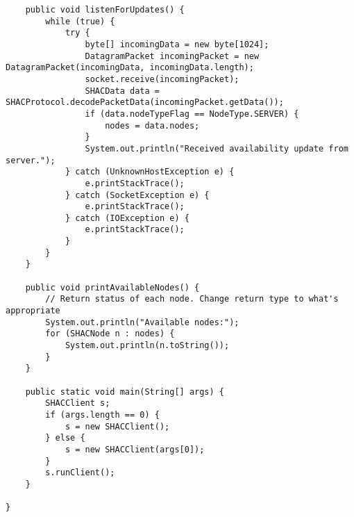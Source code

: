 \documentclass[11pt]{article}
\begin{document}
\begin{doublespace}
\begin{lstlisting}
    public void listenForUpdates() {
        while (true) {
            try {
                byte[] incomingData = new byte[1024];
                DatagramPacket incomingPacket = new DatagramPacket(incomingData, incomingData.length);
                socket.receive(incomingPacket);
                SHACData data = SHACProtocol.decodePacketData(incomingPacket.getData());
                if (data.nodeTypeFlag == NodeType.SERVER) {
                    nodes = data.nodes;
                }
                System.out.println("Received availability update from server.");
            } catch (UnknownHostException e) {
                e.printStackTrace();
            } catch (SocketException e) {
                e.printStackTrace();
            } catch (IOException e) {
                e.printStackTrace();
            }
        }
    }

    public void printAvailableNodes() {
        // Return status of each node. Change return type to what's appropriate
        System.out.println("Available nodes:");
        for (SHACNode n : nodes) {
            System.out.println(n.toString());
        }
    }

    public static void main(String[] args) {
        SHACClient s;
        if (args.length == 0) {
            s = new SHACClient();
        } else {
            s = new SHACClient(args[0]);
        }
        s.runClient();
    }

}

\end{lstlisting}

\end{doublespace}
\end{document}
